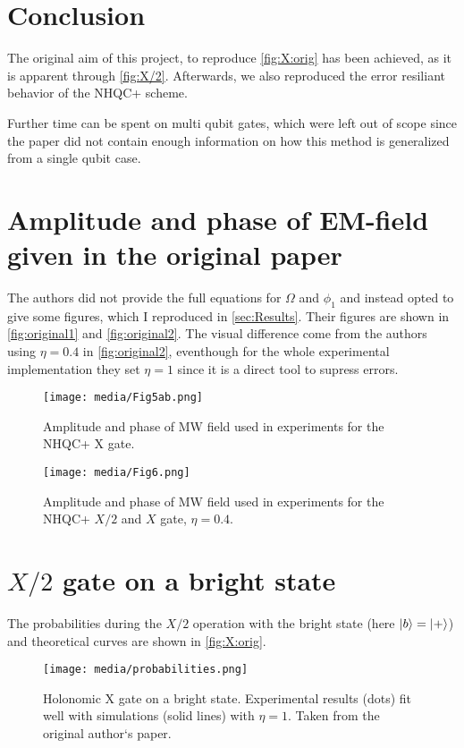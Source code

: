 \documentclass[%
reprint,
amsmath,amssymb,
aps,
]{revtex4-2}
\begin{document}
\section{Conclusion}
\label{sec:Introduction}
The original aim of this project, to reproduce \autoref{fig:X:orig} has been achieved, as it is
apparent through \autoref{fig:X/2}. Afterwards, we also reproduced the error resiliant behavior of
the NHQC+ scheme. 

Further time can be spent on multi qubit gates, which were left out of scope since the paper did not
contain enough information on how this method is generalized from a single qubit case.

\appendix

\section{Amplitude and phase of EM-field given in the original paper}
\label{sec:Amplitude and phase of EM-field given in the original paper}
The authors did not provide the full equations for $\Omega$ and $\phi_1$ and instead opted to give
some figures, which I reproduced in \autoref{sec:Results}. Their figures are shown in
\autoref{fig:original1} and
\autoref{fig:original2}. The visual difference come from the authors using $\eta = 0.4$ in
\autoref{fig:original2}, eventhough for the whole experimental implementation they set $\eta=1$ since it
is a direct tool to supress errors. 

\begin{figure}
  \centering
  \texttt{[image: media/Fig5ab.png]}
  \caption{Amplitude and phase of MW field used in experiments for the NHQC+ X gate.}
  \label{fig:original1}
\end{figure}
\begin{figure}
  \centering
  \texttt{[image: media/Fig6.png]}
  \caption{Amplitude and phase of MW field used in experiments for the NHQC+ $X/2$ and $X$ gate,
  $\eta = 0.4$.}
  \label{fig:original2}
\end{figure}

\section{$X/2$ gate on a bright state}
\label{sec:$X/2$ gate}
The probabilities during the $X/2$ operation with the bright state (here $\ket{b} = \ket{+}$) and
theoretical curves are
shown in \autoref{fig:X:orig}.
\begin{figure}
  \centering
  \texttt{[image: media/probabilities.png]}
  \caption{Holonomic X gate on a bright state. Experimental results
  (dots) ﬁt well with simulations (solid lines) with $\eta = 1$. Taken from the original author`s paper.}
  \label{fig:X:orig}
\end{figure}
\end{document}
